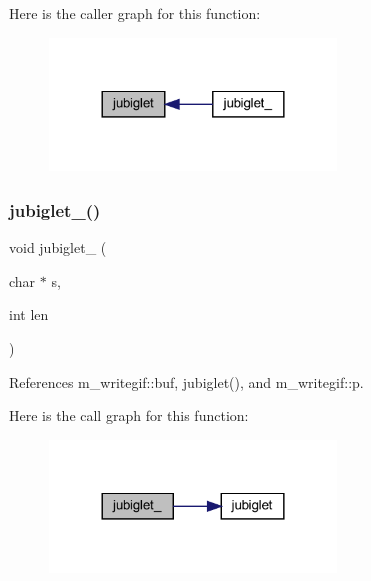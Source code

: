 Here is the caller graph for this function\+:
\nopagebreak
\begin{figure}[H]
\begin{center}
\leavevmode
\includegraphics[width=216pt]{C-jubiglet_8c_adc484767e979a59ef703547d98fab384_icgraph}
\end{center}
\end{figure}
\mbox{\label{C-jubiglet_8c_a6a4a6c766aa968996649c44415282c91}} 
\subsubsection{\texorpdfstring{jubiglet\+\_\+()}{jubiglet\_()}}
{\footnotesize\ttfamily void jubiglet\+\_\+ (\begin{DoxyParamCaption}\item[{char $\ast$}]{s,  }\item[{int}]{len }\end{DoxyParamCaption})}



References m\+\_\+writegif\+::buf, jubiglet(), and m\+\_\+writegif\+::p.

Here is the call graph for this function\+:
\nopagebreak
\begin{figure}[H]
\begin{center}
\leavevmode
\includegraphics[width=216pt]{C-jubiglet_8c_a6a4a6c766aa968996649c44415282c91_cgraph}
\end{center}
\end{figure}
